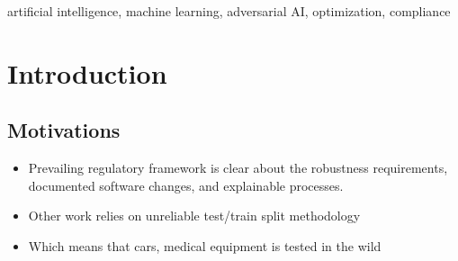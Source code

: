 \documentclass[conference]{IEEEtran}
\begin{document}
\begin{IEEEkeywords}
artificial intelligence, machine learning, adversarial AI, optimization, compliance
\end{IEEEkeywords}


\section{Introduction}
\subsection{Motivations}
\begin{itemize}
    \item Prevailing regulatory framework is clear about the robustness requirements, documented software changes, and explainable processes.
    \item Other work relies on unreliable test/train split methodology
    \item Which means that cars, medical equipment is tested in the wild
\end{itemize}
\end{document}
